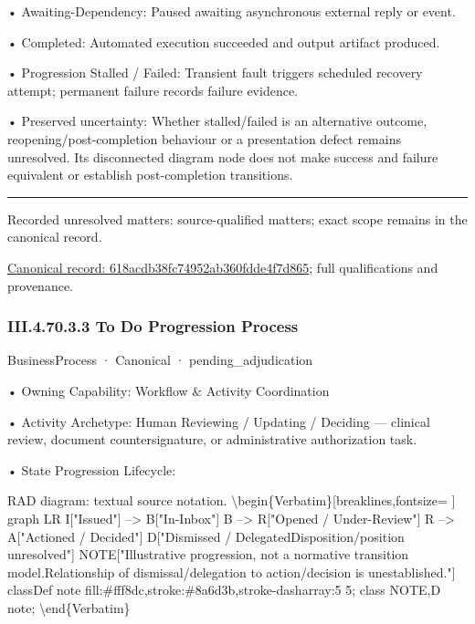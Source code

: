 •
Awaiting-Dependency: Paused awaiting asynchronous external reply or event.



•
Completed: Automated execution succeeded and output artifact produced.



•
Progression Stalled / Failed: Transient fault triggers scheduled recovery attempt; permanent failure records failure evidence.



•
Preserved uncertainty: Whether stalled/failed is an alternative outcome, reopening/post-completion behaviour or a presentation defect remains unresolved. Its disconnected diagram node does not make success and failure equivalent or establish post-completion transitions.



\medskip\hrule\medskip

{\small Recorded unresolved matters: source-qualified matters; exact scope remains in the canonical record.}\par
{\footnotesize \href{../../../../continuum/business/business-process/618acdb38fc74952ab360fdde4f7d865.md}{Canonical record: 618acdb38fc74952ab360fdde4f7d865}; full qualifications and provenance.}\par
\subsubsection*{III.4.70.3.3 To Do Progression Process}
\label{navigation:III.4.70.3.3}

\label{element:c5e4c3076b094c98a628179b91ae03d0}
{\small BusinessProcess · Canonical · pending\_adjudication}\par

•
Owning Capability: Workflow \& Activity Coordination



•
Activity Archetype: Human Reviewing / Updating / Deciding — clinical review, document countersignature, or administrative authorization task.



•
State Progression Lifecycle:



RAD diagram: textual source notation.
\textbackslash{}begin\{Verbatim\}[breaklines,fontsize=
]
graph LR
    I["Issued"] --> B["In-Inbox"]
    B --> R["Opened / Under-Review"]
    R --> A["Actioned / Decided"]
    D["Dismissed / Delegated\newline{}Disposition/position unresolved"]
    NOTE["Illustrative progression, not a normative transition model.\newline{}Relationship of dismissal/delegation to action/decision is unestablished."]
    classDef note fill:\#fff8dc,stroke:\#8a6d3b,stroke-dasharray:5 5;
    class NOTE,D note;
\textbackslash{}end\{Verbatim\}



